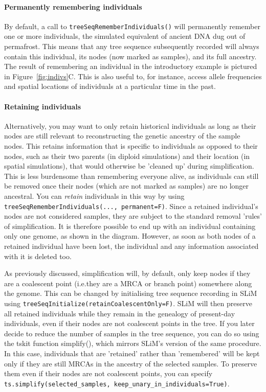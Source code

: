 \documentclass[12pt]{article}
\newcommand*{\ie}{i.e.\xcomma}
\begin{document}
\paragraph{Permanently remembering individuals}
By default, a call to \verb|treeSeqRememberIndividuals()|
will permanently remember one or more individuals,
the simulated equivalent of ancient DNA dug out of permafrost.
This means that any tree sequence subsequently recorded will always contain this individual,
its nodes (now marked as samples), and its full ancestry.
The result of remembering an individual in the introductory example is pictured
in Figure~\ref{fig:indivs}C.
This is also useful to, for instance, access allele frequencies and spatial locations of individuals
at a particular time in the past.

\paragraph{Retaining individuals}
Alternatively, you may want to only retain historical individuals as long as their nodes are still
relevant to reconstructing the genetic ancestry of the sample nodes.
This retains information that is specific to individuals as opposed to their nodes,
such as their two parents (in diploid simulations) and their location (in spatial simulations), that would otherwise be 'cleaned up' during simplification.
This is less burdensome than remembering everyone alive, as individuals can still be removed once their
nodes (which are not marked as samples) are no longer ancestral.
You can \emph{retain} individuals in this way by using
\verb|treeSeqRememberIndividuals(..., permanent=F)|.
Since a retained individual’s nodes are not considered samples,
they are subject to the standard removal 'rules' of simplification.
It is therefore possible to end up with an individual containing only one genome, as shown in the diagram.
However, as soon as both nodes of a retained individual have been lost,
the individual and any information associated with it is deleted too.

As previously discussed, simplification will, by default, only keep nodes if they are a coalescent point
(\ie they are a MRCA or branch point) somewhere along the genome.
This can be changed by initialising tree sequence recording in SLiM using
\verb|treeSeqInitialize(retainCoalescentOnly=F)|.
SLiM will then preserve all retained individuals while they remain in the genealogy of present-day individuals,
even if their nodes are not coalescent points in the tree.
If you later decide to reduce the number
of samples in the tree sequence, you can do so using the tskit function simplify(),
which mirrors SLiM's version of the same procedure.
In this case, individuals that are 'retained' rather than 'remembered' will be kept only
if they are still MRCAs in the ancestry of the selected samples.
To preserve them even if their nodes are not coalescent points,
you can specify \verb|ts.simplify(selected_samples, keep_unary_in_individuals=True)|.
\end{document}

